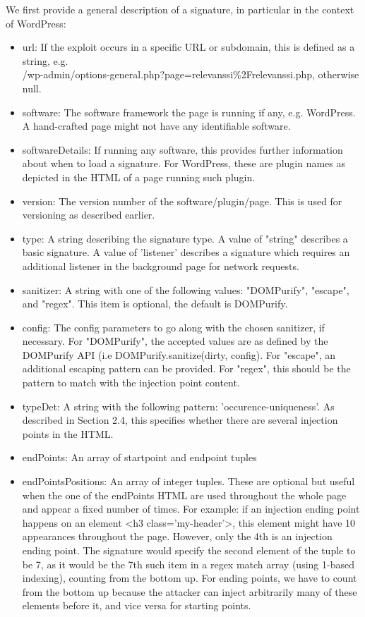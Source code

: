 We first provide a general description of a signature, in particular in the context of WordPress:
\begin{itemize}
	\item
	url: If the exploit occurs in a specific URL or subdomain, this is defined as a string, e.g.
	\\ /wp-admin/options-general.php?page=relevanssi\%2Frelevanssi.php, otherwise null.
	\item
	software: The software framework the page is running if any, e.g. WordPress. A hand-crafted page
	might not have any identifiable software.
	\item
	softwareDetails: If running any software, this provides further information about when to load a signature. For WordPress, these are plugin names as depicted in the HTML of a page running such plugin.
	\item
	version: The version number of the software/plugin/page. This is used for versioning as described earlier.
	\item 
	type: A string describing the signature type. A value of "string" describes a basic signature. A value of 'listener' describes a signature which requires an additional listener in the background page for network requests.
	\item 
	sanitizer: A string with one of the following values: "DOMPurify", "escape", and "regex". This item is optional, the default is DOMPurify.
	\item
	config: The config parameters to go along with the chosen sanitizer, if necessary. For "DOMPurify", the accepted values are as defined by the DOMPurify API (i.e DOMPurify.sanitize(dirty, config). For "escape", an additional escaping pattern can be provided. For "regex", this should be the pattern to match with the injection point content.
	\item
	typeDet: A string with the following pattern: 'occurence-uniqueness'. As described in Section 2.4, this specifies whether there are several injection points in the HTML.
	\item
	endPoints: An array of startpoint and endpoint tuples
	\item 
	endPointsPositions: An array of integer tuples. These are optional but useful when the one of the endPoints HTML are used throughout the whole page and appear a fixed number of times. For example: if an injection ending point happens on an element <h3 class='my-header'>, this element might have 10 appearances throughout the page. However, only the 4th is an injection ending point. The signature would specify the second element of the tuple to be 7, as it would be the 7th such item in a regex match array (using 1-based indexing), counting from the bottom up. For ending points, we have to count from the bottom up because the attacker can inject arbitrarily many of these elements before it, and vice versa for starting points.
\end{itemize}

